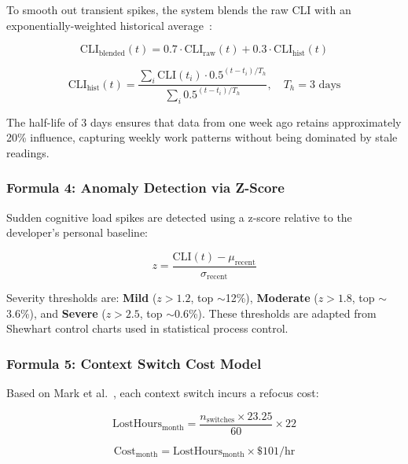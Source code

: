 \documentclass[12pt]{article}
\begin{document}
To smooth out transient spikes, the system blends the raw CLI with an exponentially-weighted historical average~\cite{brown1956exponential}:

\begin{equation}
\text{CLI}_{\text{blended}}(t) = 0.7 \cdot \text{CLI}_{\text{raw}}(t) + 0.3 \cdot \text{CLI}_{\text{hist}}(t)
\label{eq:blend}
\end{equation}

\begin{equation}
\text{CLI}_{\text{hist}}(t) = \frac{\sum_{i} \text{CLI}(t_i) \cdot 0.5^{(t - t_i)/T_h}}{\sum_{i} 0.5^{(t - t_i)/T_h}}, \quad T_h = 3 \text{ days}
\label{eq:hist}
\end{equation}

The half-life of 3 days ensures that data from one week ago retains approximately 20\% influence, capturing weekly work patterns without being dominated by stale readings.

\subsubsection{Formula 4: Anomaly Detection via Z-Score}

Sudden cognitive load spikes are detected using a z-score relative to the developer's personal baseline:

\begin{equation}
z = \frac{\text{CLI}(t) - \mu_{\text{recent}}}{\sigma_{\text{recent}}}
\label{eq:zscore}
\end{equation}

Severity thresholds are: \textbf{Mild} ($z > 1.2$, top $\sim$12\%), \textbf{Moderate} ($z > 1.8$, top $\sim$3.6\%), and \textbf{Severe} ($z > 2.5$, top $\sim$0.6\%). These thresholds are adapted from Shewhart control charts used in statistical process control.

\subsubsection{Formula 5: Context Switch Cost Model}

Based on Mark et al.~\cite{mark2008cost}, each context switch incurs a refocus cost:

\begin{equation}
\text{LostHours}_{\text{month}} = \frac{n_{\text{switches}} \times 23.25}{60} \times 22
\label{eq:switchcost}
\end{equation}

\begin{equation}
\text{Cost}_{\text{month}} = \text{LostHours}_{\text{month}} \times \$101/\text{hr}
\label{eq:moncost}
\end{equation}
\end{document}
